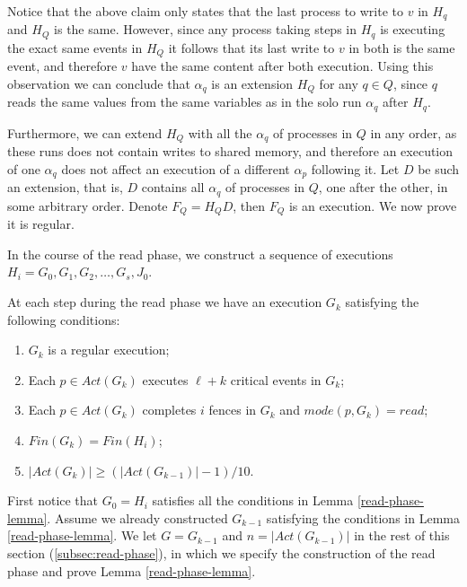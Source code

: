 Notice that the above claim only states that the last process to write to $v$ in $H_q$ and $H_Q$ is the same. However, since any process taking steps in $H_q$ is executing the exact same events in $H_Q$ it follows that its last write to $v$ in both is the same event, and therefore $v$ have the same content after both execution. Using this observation we can conclude that $\alpha_q$ is an extension $H_Q$ for any $q \in Q$, since $q$ reads the same values from the same variables as in the solo run $\alpha_q$ after $H_q$.

Furthermore, we can extend $H_Q$ with all the $\alpha_q$ of processes in $Q$ in any order, as these runs does not contain writes to shared memory, and therefore an execution of one $\alpha_q$ does not affect an execution of a different $\alpha_p$ following it. Let $D$ be such an extension, that is, $D$ contains all $\alpha_q$ of processes in $Q$, one after the other, in some arbitrary order. Denote $F_Q = H_Q D$, then $F_Q$ is an execution. We now prove it is regular.

















\newpage
In the course of the read phase, we construct a sequence of executions $H_i=G_0,G_1,G_2,\ldots,G_s, J_0$.

\begin{lemma} \label{read-phase-lemma}
	At each step during the read phase we have an execution $G_k$ satisfying the following conditions:
	\begin{enumerate}[(1)]
		\item $G_k$ is a regular execution;
		\item Each $p \in Act(G_k)$ executes $\ell+k$ critical events in $G_k$;
		\item Each $p \in Act(G_k)$ completes $i$ fences in $G_k$ and $mode(p,G_k) = read$;
		\item $Fin(G_k) = Fin(H_i)$;
		\item $|Act(G_k)| \geq (|Act(G_{k-1})|-1)/10$.
	\end{enumerate}
\end{lemma}

\vspace{3mm} First notice that $G_0 = H_i$ satisfies all the conditions in Lemma \ref{read-phase-lemma}. Assume we already constructed $G_{k-1}$ satisfying the conditions in Lemma \ref{read-phase-lemma}. We let $G=G_{k-1}$ and $n=|Act(G_{k-1})|$ in the rest of this section (\ref{subsec:read-phase}), in which we specify the construction of the read phase and prove Lemma \ref{read-phase-lemma}.

